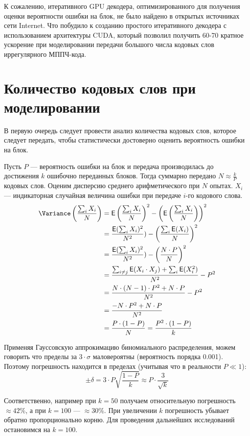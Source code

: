 К сожалению, итеративного GPU декодера, оптимизированного для получения оценки вероятности ошибки на блок,
не было найдено в открытых источниках сети Internet. Что побудило к созданию простого итеративного декодера
с использованием архитектуры CUDA, который позволил получить 60-70 кратное ускорение при моделировании
передачи большого числа кодовых слов иррегулярного МППЧ-кода.

\section{Количество кодовых слов при моделировании}

В первую очередь следует провести анализ количества кодовых слов, которое следует передать, чтобы 
статистически достоверно оценить вероятность ошибки на блок.

Пусть $P$ --- вероятность ошибки на блок и передача производилась до достижения $k$ ошибочно переданных блоков.
Тогда суммарно передано $N\approx \frac{k}{P}$ кодовых слов. Оценим дисперсию среднего арифметического при 
$N$ опытах. $X_i$ --- индикаторная случайная величина ошибки при передаче $i$-го кодового слова. 
\newcommand{\Expect}{\mathsf{E}}
\[
	\begin{split}
	\Variance \left({\frac{\sum_i{X_i}}{N}}\right) & =
	\Expect \left(\frac{\sum_i{X_i}}{N}\right)^2-\left(\Expect \left(\frac{\sum_i{X_i}}{N}\right)\right)^2 \\
	& = \frac{\Expect(\sum_i{X_i})^2}{N^2})-\left(\frac{\sum_i{\Expect(X_i)}}{N}\right)^2 \\
	& = \frac{\Expect(\sum_i{X_i})^2}{N^2})-\left(\frac{N \cdot P}{N}\right)^2 \\
	& = \frac{\sum_{i \neq j}{\Expect(X_i \cdot X_j)} + \sum_i{\Expect(X_i^2)}}{N^2}-P^2 \\
	& = \frac{N \cdot (N - 1) \cdot P^2 + N \cdot P}{N^2}-P^2 \\
	& = \frac{-N \cdot P^2 + N \cdot P}{N^2} \\
	& = \frac{P \cdot (1 - P)}{N}  = \frac{P^2 \cdot (1 - P)}{k}
	\end{split}
\]

Применяя Гауссовскую аппрокимацию биномиального распределения, можем говорить что пределы за $3\cdot \sigma$
маловероятны (вероятность порядка 0.001). Поэтому погрешность находится в пределах (учитывая что в реальности
$P \ll 1$):
\[
\pm \delta = 3 \cdot P \sqrt{\frac{1 - P}{k}} \approx P \cdot \frac{3}{\sqrt{k}} 
\]	 

Соответственно, например при $k=50$ получаем относительную погрешность $\approx 42\%$, 
а при $k=100$ --- $\approx 30\%$. При увеличении $k$ погрешность убывает обратно пропорционально корню.
Для проведения дальнейших исследований остановимся на $k=100$.

